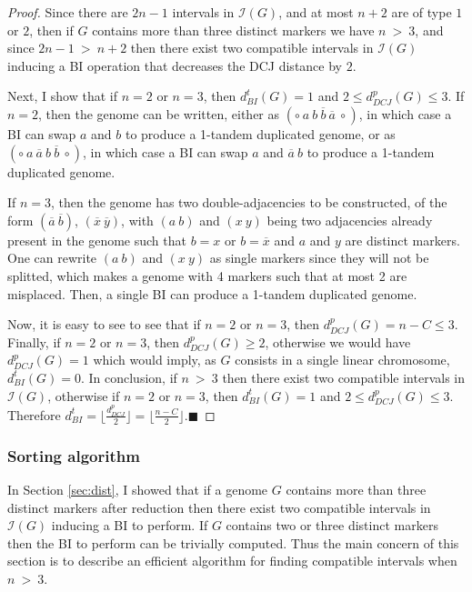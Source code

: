 \documentclass[11pt,final,twoside,nofrench]{thlifl}
\newcommand{\qed}{\ensuremath{\blacksquare}}
\newcommand{\fst}[1]{ \ensuremath{#1} }
\newcommand{\snd}[1]{ \ensuremath{\overline{#1}} }
\newcommand\aff[2]{\ensuremath{(\fst{#1}~\fst{#2})}}
\newcommand\ass[2]{\ensuremath{(\snd{#1}~\snd{#2})}}
\newtheorem{proof}{Proof}
\begin{document}
\begin{proof}

    Since there are $2n - 1$ intervals in $\mathcal{I}(G)$, and at
    most $n+2$ are of type $1$ or $2$, then if $G$ contains more than three distinct markers we have $n~>~3$, and since
    $2n-1~>~n+2$ then there exist two compatible intervals in
    $\mathcal{I}(G)$ inducing a BI operation that decreases the DCJ
    distance by $2$.

Next, I show that if $n = 2$ or $n = 3$, then $d^t_{BI}(G)=1$ and $2
\leq d^p_{DCJ}(G) \leq 3$.
 If $n = 2$, then the genome can be written, either as
$(\circ~\fst{a}~\fst{b}~\snd{b}~\snd{a}~ \circ)$, in which case a BI
can swap $\fst{a}$ and $\fst{b}$ to produce a 1-tandem duplicated
genome, or as $(\circ~\fst{a}~\snd{a}~\fst{b}~\snd{b}~\circ)$, in
which case a BI can swap $a$ and $\snd{a}~\fst{b}$ to produce a
1-tandem duplicated genome.

If $n = 3$, then the genome has two double-adjacencies to be
constructed, of the form $\ass{a}{b}$, $\ass{x}{y}$, with $\aff{a}{b}$
and $\aff{x}{y}$ being two adjacencies already present in the genome
such that $\fst{b} = \fst{x}$ or $\fst{b} = \snd{x}$ and $a$ and $y$
are distinct markers. One can rewrite $\aff{a}{b}$ and $\aff{x}{y}$ as
single markers since they will not be splitted, which makes a genome
with 4 markers such that at most 2 are misplaced. Then, a single BI
can produce a 1-tandem duplicated genome.

Now, it is easy to see to see that if  $n = 2$ or $n = 3$, then $d^p_{DCJ}(G) = n- C \leq 3$. Finally, if  $n = 2$ or $n = 3$, then $d^p_{DCJ}(G) \geq 2$, otherwise we would have  $d^p_{DCJ}(G) = 1$ which would imply, as $G$ consists in a single linear chromosome, $d^t_{BI}(G) = 0$.
In conclusion, if $n~>~3$ then there exist two compatible intervals in  $\mathcal{I}(G)$, otherwise if  $n = 2$ or $n = 3$, then $d^t_{BI}(G)=1$ and  $2 \leq d^p_{DCJ}(G) \leq 3$. Therefore $d^t_{BI} = \lfloor \frac{d^p_{DCJ}}{2}\rfloor = \lfloor \frac{n-C}{2}\rfloor$.\qed
\end{proof}

\subsubsection{Sorting algorithm}
\label{sec:scenario}

\noindent
In Section \ref{sec:dist}, I showed that if a genome $G$ contains more than 
three distinct markers after reduction then there exist two compatible 
intervals in $\mathcal{I}(G)$ inducing a BI to perform.
If $G$ contains two or three distinct markers then the BI to perform can be 
trivially computed.
Thus the main concern of this section is to describe an efficient algorithm 
for finding compatible intervals when $n~>~3$.
\end{document}
